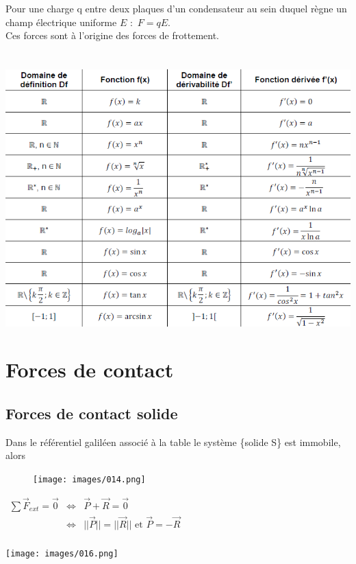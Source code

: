 \documentclass[a4paper,10pt]{book}
\begin{document}
Pour une charge q entre deux plaques d’un condensateur au sein duquel règne un champ électrique uniforme $E$ $:$ $F=qE$.\\

Ces forces sont à l’origine des forces de frottement.\\\\\\

\includegraphics[scale=1]{images/017.png}

\newpage

\section{Forces de contact}
\subsection{Forces de contact solide}
Dans le référentiel galiléen associé à la table le système \{solide S\} est immobile, alors \begin{figure} \texttt{[image: images/014.png]} \end{figure}
$\begin{array}{rcl} \sum \vec{F}_{ext}=\vec{0} &\Leftrightarrow & \vec{P}+\vec{R}=\vec{0}\\
&\Leftrightarrow & ||\vec{P}||=||\vec{R}|| \text{ et } \vec{P}=-\vec{R} \end{array}$\\\\

\texttt{[image: images/016.png]}
\end{document}
